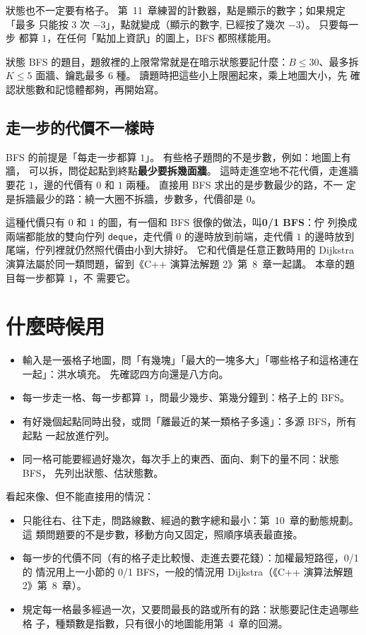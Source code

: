 狀態也不一定要有格子。 第~11~章練習的計數器，點是顯示的數字；如果規定「最多
只能按 $3$ 次 $-3$」，點就變成（顯示的數字, 已經按了幾次 $-3$）。 只要每一步
都算 $1$，在任何「點加上資訊」的圖上，BFS 都照樣能用。

\begin{apcsnote}
狀態 BFS 的題目，題敘裡的上限常常就是在暗示狀態要記什麼：$B \le 30$、最多拆
$K \le 5$ 面牆、鑰匙最多 $6$ 種。 讀題時把這些小上限圈起來，乘上地圖大小，先
確認狀態數和記憶體都夠，再開始寫。
\end{apcsnote}

\subsection{走一步的代價不一樣時}
\label{sec:01bfs-preview}

BFS 的前提是「每走一步都算 $1$」。 有些格子題問的不是步數，例如：地圖上有牆，
可以拆，問從起點到終點\textbf{最少要拆幾面牆}。 這時走進空地不花代價，走進牆
要花 $1$，邊的代價有 $0$ 和 $1$ 兩種。 直接用 BFS 求出的是步數最少的路，不一
定是拆牆最少的路：繞一大圈不拆牆，步數多，代價卻是 $0$。

這種代價只有 $0$ 和 $1$ 的圖，有一個和 BFS 很像的做法，叫\textbf{0/1 BFS}：佇
列換成兩端都能放的雙向佇列 \texttt{deque}，走代價 $0$ 的邊時放到前端，走代價
$1$ 的邊時放到尾端，佇列裡就仍然照代價由小到大排好。 它和代價是任意正數時用的
Dijkstra 演算法屬於同一類問題，留到《C++ 演算法解題 2》第~8~章一起講。 本章的題目每一步都算 $1$，不
需要它。

\section{什麼時候用}
\label{sec:grid-when}

\begin{itemize}
\item 輸入是一張格子地圖，問「有幾塊」「最大的一塊多大」「哪些格子和這格連在
一起」：洪水填充。 先確認四方向還是八方向。
\item 每一步走一格、每一步都算 $1$，問最少幾步、第幾分鐘到：格子上的 BFS。
\item 有好幾個起點同時出發，或問「離最近的某一類格子多遠」：多源 BFS，所有起點
一起放進佇列。
\item 同一格可能要經過好幾次，每次手上的東西、面向、剩下的量不同：狀態 BFS，
先列出狀態、估狀態數。
\end{itemize}

看起來像、但不能直接用的情況：

\begin{itemize}
\item 只能往右、往下走，問路線數、經過的數字總和最小：第~10~章的動態規劃。 這
類問題要的不是步數，移動方向又固定，照順序填表最直接。
\item 每一步的代價不同（有的格子走比較慢、走進去要花錢）：加權最短路徑，0/1 的
情況用上一小節的 0/1 BFS，一般的情況用 Dijkstra（《C++ 演算法解題 2》第~8~章）。
\item 規定每一格最多經過一次，又要問最長的路或所有的路：狀態要記住走過哪些格
子，種類數是指數，只有很小的地圖能用第~4~章的回溯。
\end{itemize}

